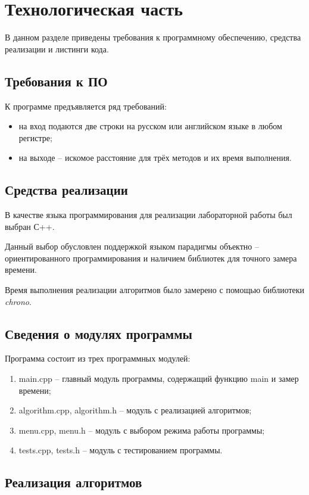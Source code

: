 \section{Технологическая часть}
В данном разделе приведены требования к программному обеспечению, средства реализации и листинги кода.

\subsection{Требования к ПО}

К программе предъявляется ряд требований:
\begin{itemize}
	\item на вход подаются две строки на русском или английском языке в любом регистре;
	\item на выходе -- искомое расстояние для трёх методов и их время выполнения.
\end{itemize}

\subsection{Средства реализации}

В качестве языка программирования для реализации лабораторной работы был выбран С++.

Данный выбор обусловлен поддержкой языком парадигмы объектно -- ориентированного программирования и наличием библиотек для точного замера времени.

Время выполнения реализации алгоритмов было замерено с помощью библиотеки \textit{chrono}.

\subsection{Сведения о модулях программы}
Программа состоит из трех программных модулей:
\begin{enumerate}[label={\arabic*)}]
	\item main.cpp -- главный модуль программы, содержащий функцию main и замер времени;
	\item algorithm.cpp, algorithm.h -- модуль с реализацией алгоритмов;
	\item menu.cpp, menu.h -- модуль с выбором режима работы программы;
	\item tests.cpp, tests.h -- модуль с тестированием программы.
\end{enumerate}

\newpage
\subsection{Реализация алгоритмов}

